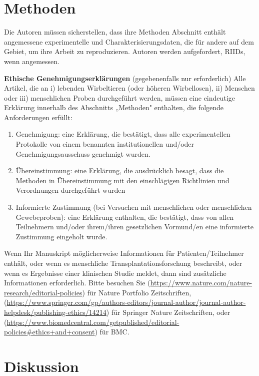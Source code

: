 \documentclass[pdflatex,sn-mathphys-num]{sn-jnl}%
\theoremstyle{thmstyleone}%
\theoremstyle{thmstyletwo}%
\theoremstyle{thmstylethree}%
\begin{document}
\section{Methoden}\label{sec11}

Die Autoren müssen sicherstellen, dass ihre Methoden Abschnitt enthält angemessene experimentelle und Charakterisierungsdaten, die für andere auf dem Gebiet, um ihre Arbeit zu reproduzieren. Autoren werden aufgefordert, RIIDs, wenn angemessen.

\textbf{Ethische Genehmigungserklärungen} (gegebenenfalls nur erforderlich) Alle Artikel, die an i) lebenden Wirbeltieren (oder höheren Wirbellosen), ii) Menschen oder iii) menschlichen Proben durchgeführt werden, müssen eine eindeutige Erklärung innerhalb des Abschnitts „Methoden" enthalten, die folgende Anforderungen erfüllt: 

\begin{enumerate}[1.]
\item Genehmigung: eine Erklärung, die bestätigt, dass alle experimentellen Protokolle von einem benannten institutionellen und/oder Genehmigungsausschuss genehmigt wurden.

\item Übereinstimmung: eine Erklärung, die ausdrücklich besagt, dass die Methoden in Übereinstimmung mit den einschlägigen Richtlinien und Verordnungen durchgeführt wurden

\item Informierte Zustimmung (bei Versuchen mit menschlichen oder menschlichen Gewebeproben): eine Erklärung enthalten, die bestätigt, dass von allen Teilnehmern und/oder ihrem/ihren gesetzlichen Vormund/en eine informierte Zustimmung eingeholt wurde.
\end{enumerate}

Wenn Ihr Manuskript möglicherweise Informationen für Patienten/Teilnehmer enthält, oder wenn es menschliche Transplantationsforschung beschreibt, oder wenn es Ergebnisse einer klinischen Studie meldet, dann sind zusätzliche Informationen erforderlich. Bitte besuchen Sie (\url{https://www.nature.com/nature-research/editorial-policies}) für Nature Portfolio Zeitschriften, (\url{https://www.springer.com/gp/authors-editors/journal-author/journal-author-helpdesk/publishing-ethics/14214}) für Springer Nature Zeitschriften, oder (\url{https://www.biomedcentral.com/getpublished/editorial-policies\#ethics+and+consent}) für BMC.

\section{Diskussion}\label{sec12}
\end{document}
